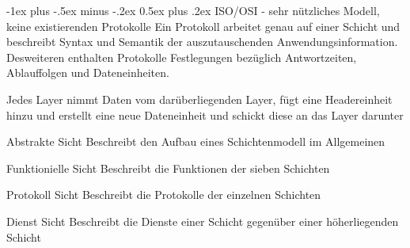 \documentclass[10pt,landscape]{article}
\makeatletter
\renewcommand{\section}{\@startsection{section}{1}{0mm}%
                                {-1ex plus -.5ex minus -.2ex}%
                                {0.5ex plus .2ex}%
                                {\normalfont\large\bfseries}}
\makeatother
\begin{document}
\section{ISO/OSI - sehr nützliches Modell, keine existierenden Protokolle}
Ein Protokoll arbeitet genau auf einer Schicht und beschreibt Syntax und Semantik der auszutauschenden Anwendungsinformation. Desweiteren enthalten Protokolle Festlegungen bezüglich Antwortzeiten, Ablauffolgen und Dateneinheiten.

Jedes Layer nimmt Daten vom darüberliegenden Layer, fügt eine Headereinheit hinzu und erstellt eine neue Dateneinheit und schickt diese an das Layer darunter

\begin{description*}
    \item[Abstrakte Sicht] Beschreibt den Aufbau eines Schichtenmodell im Allgemeinen
    \item[Funktionielle Sicht] Beschreibt die Funktionen der sieben Schichten
    \item[Protokoll Sicht] Beschreibt die Protokolle der einzelnen Schichten
    \item[Dienst Sicht] Beschreibt die Dienste einer Schicht gegenüber einer höherliegenden Schicht    
\end{description*}
\end{document}
